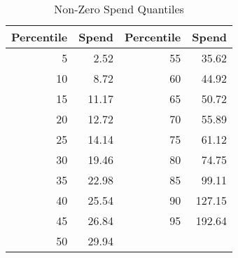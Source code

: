 \begin{table}[ht]
\centering
\caption{Non-Zero Spend Quantiles} 
\label{tab:cutoffs}
\begin{tabular}{rrrr}
  \hline
Percentile & Spend & Percentile & Spend \\ 
  \hline
5 & 2.52 & 55 & 35.62 \\ 
  10 & 8.72 & 60 & 44.92 \\ 
  15 & 11.17 & 65 & 50.72 \\ 
  20 & 12.72 & 70 & 55.89 \\ 
  25 & 14.14 & 75 & 61.12 \\ 
  30 & 19.46 & 80 & 74.75 \\ 
  35 & 22.98 & 85 & 99.11 \\ 
  40 & 25.54 & 90 & 127.15 \\ 
  45 & 26.84 & 95 & 192.64 \\ 
  50 & 29.94 &  &  \\ 
   \hline
\end{tabular}
\end{table}
